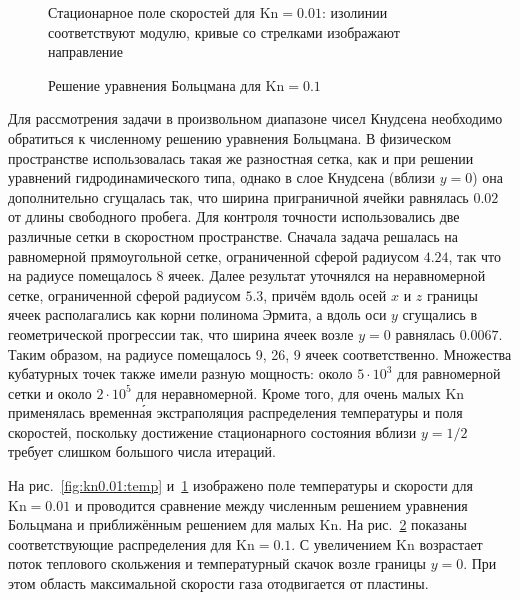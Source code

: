 \documentclass[
aps,%
12pt,%
final,%
notitlepage,%
oneside,%
onecolumn,%
nobibnotes,%
nofootinbib,%
superscriptaddress,%
noshowpacs,%
showkeys,%
centertags]%
{revtex4}
\newcommand{\Kn}{\mathrm{Kn}}
\begin{document}
\begin{figure}
    \centering
    \caption{Стационарное поле скоростей для \(\Kn=0.01\):
        изолинии соответствуют модулю, кривые со стрелками изображают направление}
    \label{fig:kn0.01:flow}
\end{figure}

\begin{figure}
    \centering
    \caption{Решение уравнения Больцмана для \(\Kn=0.1\)}
    \label{fig:kn0.1}
\end{figure}

Для рассмотрения задачи в произвольном диапазоне чисел Кнудсена необходимо
обратиться к численному решению уравнения Больцмана.
В физическом пространстве использовалась такая же разностная сетка,
как и при решении уравнений гидродинамического типа,
однако в слое Кнудсена (вблизи \(y=0\)) она дополнительно сгущалась так,
что ширина приграничной ячейки равнялась \(0.02\) от длины свободного пробега.
Для контроля точности использовались две различные сетки в скоростном пространстве.
Сначала задача решалась на равномерной прямоугольной сетке, ограниченной сферой радиусом \(4.24\),
так что на радиусе помещалось 8 ячеек.
Далее результат уточнялся на неравномерной сетке, ограниченной сферой радиусом \(5.3\),
причём вдоль осей \(x\) и \(z\) границы ячеек располагались как корни полинома Эрмита,
а вдоль оси \(y\) сгущались в геометрической прогрессии так,
что ширина ячеек возле \(y=0\) равнялась \(0.0067\).
Таким образом, на радиусе помещалось 9, 26, 9 ячеек соответственно.
Множества кубатурных точек также имели разную мощность: около \(5\cdot10^3\) для равномерной сетки
и около \(2\cdot10^5\) для неравномерной.
Кроме того, для очень малых \(\Kn\) применялась временн\'{а}я экстраполяция распределения температуры
и поля скоростей, поскольку достижение стационарного состояния вблизи \(y=1/2\)
требует слишком большого числа итераций.

На рис.~\ref{fig:kn0.01:temp} и~\ref{fig:kn0.01:flow} изображено поле температуры и скорости
для \(\Kn=0.01\) и проводится сравнение между численным решением уравнения Больцмана
и приближённым решением для малых \(\Kn\).
На рис.~\ref{fig:kn0.1} показаны соответствующие распределения для \(\Kn=0.1\).
С увеличением \(\Kn\) возрастает поток теплового скольжения и температурный скачок возле границы \(y=0\).
При этом область максимальной скорости газа отодвигается от пластины.
\end{document}
